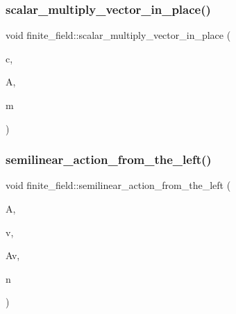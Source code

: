 \mbox{\label{classfinite__field_ab9b0987ee489bda0ad9027bbe3b3a930}} 
\subsubsection{\texorpdfstring{scalar\+\_\+multiply\+\_\+vector\+\_\+in\+\_\+place()}{scalar\_multiply\_vector\_in\_place()}}
{\footnotesize\ttfamily void finite\+\_\+field\+::scalar\+\_\+multiply\+\_\+vector\+\_\+in\+\_\+place (\begin{DoxyParamCaption}\item[{\mbox{\hyperlink{galois_8h_a09fddde158a3a20bd2dcadb609de11dc}{I\+NT}}}]{c,  }\item[{\mbox{\hyperlink{galois_8h_a09fddde158a3a20bd2dcadb609de11dc}{I\+NT}} $\ast$}]{A,  }\item[{\mbox{\hyperlink{galois_8h_a09fddde158a3a20bd2dcadb609de11dc}{I\+NT}}}]{m }\end{DoxyParamCaption})}

\mbox{\label{classfinite__field_aad0ad74413dd69703074846e443bd53a}} 
\subsubsection{\texorpdfstring{semilinear\+\_\+action\+\_\+from\+\_\+the\+\_\+left()}{semilinear\_action\_from\_the\_left()}}
{\footnotesize\ttfamily void finite\+\_\+field\+::semilinear\+\_\+action\+\_\+from\+\_\+the\+\_\+left (\begin{DoxyParamCaption}\item[{\mbox{\hyperlink{galois_8h_a09fddde158a3a20bd2dcadb609de11dc}{I\+NT}} $\ast$}]{A,  }\item[{\mbox{\hyperlink{galois_8h_a09fddde158a3a20bd2dcadb609de11dc}{I\+NT}} $\ast$}]{v,  }\item[{\mbox{\hyperlink{galois_8h_a09fddde158a3a20bd2dcadb609de11dc}{I\+NT}} $\ast$}]{Av,  }\item[{\mbox{\hyperlink{galois_8h_a09fddde158a3a20bd2dcadb609de11dc}{I\+NT}}}]{n }\end{DoxyParamCaption})}

